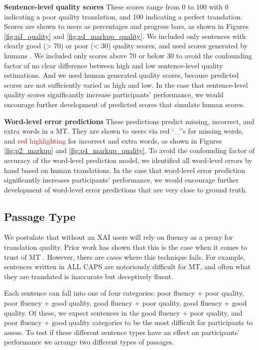 \begin{compacthang}
    \item \textbf{Sentence-level quality scores} These scores range from 0 to 100 with 0 indicating a poor quality translation, and 100 indicating a perfect translation. Scores are shown to users as percentages and progress bars, as shown in Figures \ref{fig:p3_quality} and \ref{fig:p4_markup_quality}. We included only sentences with clearly good (> 70) or poor (< 30) quality scores, and used scores generated by humans . We included only scores above 70 or below 30 to avoid the confounding factor of no clear difference between high and low sentence-level quality estimations. And we used human generated quality scores, because predicted scores are not sufficiently varied as high and low. In the case that sentence-level quality scores significantly increase participants’ performance, we would encourage further development of predicted scores that simulate human scores. 

    \item \textbf{Word-level error predictions} These predictions predict missing, incorrect, and extra words in a MT. They are shown to users via red `\textcolor{red}{\_}''s for missing words, and \textcolor{red}{red highlighting} for incorrect and extra words, as shown in Figures \ref{fig:p2_markup} and \ref{fig:p4_markup_quality}. To avoid the confounding factor of accuracy of the word-level prediction model, we identified all word-level errors by hand based on human translations. In the case that word-level error prediction significantly increases participants’ performance, we would encourage further development of word-level error predictions that are very close to ground truth.  
\end{compacthang}

\subsection{Passage Type}
We postulate that without an XAI users will rely on fluency as a proxy for translation quality. Prior work has shown that this is the case when it comes to trust of MT \cite{martindaleFluency2018}. However, there are cases where this technique fails. For example, sentences written in ALL CAPS are notoriously difficult for MT, and often what they are translated is inaccurate but deceptively fluent. 

Each sentence can fall into one of four categories: poor fluency + poor quality, poor fluency + good quality, good fluency + poor quality, good fluency + good quality. Of these, we expect  sentences in the good fluency + poor quality, and poor fluency + good quality categories to be the most difficult for participants to assess. To test if these different sentence types have an effect on participants’ performance we arrange two different types of passages. 

